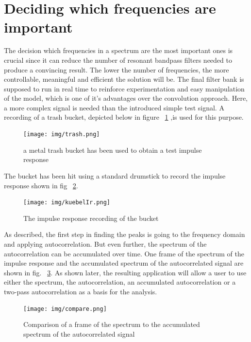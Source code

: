 \section{Deciding which frequencies are important}
\label{subsec:peakDetection}
The decision which frequencies in a spectrum are the most important ones is crucial since it can reduce the number of resonant bandpass filters needed to produce a convincing result. The lower the number of frequencies, the more controllable, meaningful and efficient the solution will be. The final filter bank is supposed to run in real time to reinforce experimentation and easy manipulation of the model, which is one of it's advantages over the convolution approach. Here, a more complex signal is needed than the introduced simple test signal. A recording of a trash bucket, depicted below in figure ~\ref{trash} ,is used for this purpose.   


\begin{figure}[h]
	\begin{center}
		\texttt{[image: img/trash.png]}
		\caption{a metal trash bucket has been used to obtain a test impulse response}
		\label{trash}
	\end{center}
\end{figure}

The bucket has been hit using a standard drumstick to record the impulse response shown in fig ~\ref{kuebelIr}.

\begin{figure}[h]
	\begin{center}
		\texttt{[image: img/kuebelIr.png]}
		\caption{The impulse response recording of the bucket}
		\label{kuebelIr}
	\end{center}
\end{figure}

As described, the first step in finding the peaks is going to the frequency domain and applying autocorrelation. But even further, the spectrum of the autocorrelation can be accumulated over time. One frame of the spectrum of the impulse response and the accumulated spectrum of the autocorrelated signal are shown in fig. ~\ref{compare}. As shown later, the resulting application will allow a user to use either the spectrum, the autocorrelation, an accumulated autocorrelation or a two-pass autocorrelation as a basis for the analysis.



\begin{figure}[h]
	\begin{center}
		\texttt{[image: img/compare.png]}
		\caption{Comparison of a frame of the spectrum to the accumulated spectrum of the autocorrelated signal}
		\label{compare}
	\end{center}	
\end{figure}




